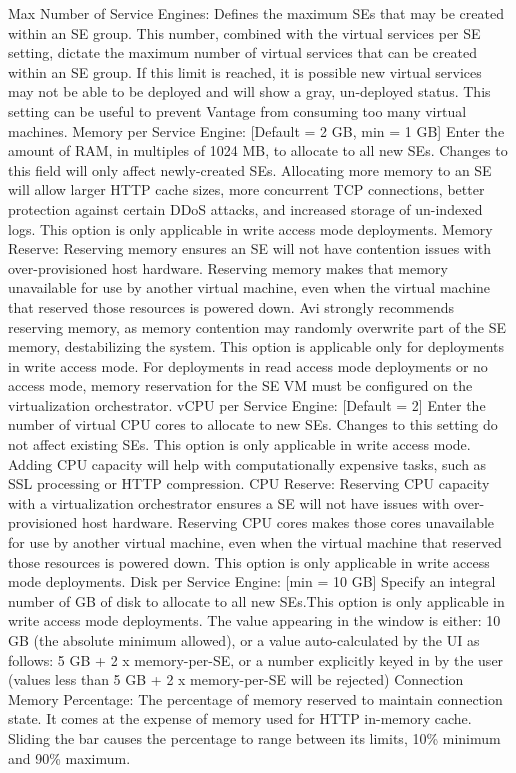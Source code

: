 \documentclass[letterpaper,10pt,english]{sphinxmanual}
\begin{document}
Max Number of Service Engines:  Defines the maximum SEs that may be created within an SE group. This number, combined with the virtual services per SE setting, dictate the maximum number of virtual services that can be created within an SE group. If this limit is reached, it is possible new virtual services may not be able to be deployed and will show a gray, un-deployed status. This setting can be useful to prevent Vantage from consuming too many virtual machines.
Memory per Service Engine:  {[}Default = 2 GB, min = 1 GB{]} Enter the amount of RAM, in multiples of 1024 MB, to allocate to all new SEs. Changes to this field will only affect newly-created SEs. Allocating more memory to an SE will allow larger HTTP cache sizes, more concurrent TCP connections, better protection against certain DDoS attacks, and increased storage of un-indexed logs. This option is only applicable in write access mode deployments.
Memory Reserve:  Reserving memory ensures an SE will not have contention issues with over-provisioned host hardware. Reserving memory makes that memory unavailable for use by another virtual machine, even when the virtual machine that reserved those resources is powered down. Avi strongly recommends reserving memory, as memory contention may randomly overwrite part of the SE memory, destabilizing the system. This option is applicable only for deployments in write access mode. For deployments in read access mode deployments or no access mode, memory reservation for the SE VM must be configured on the virtualization orchestrator.
vCPU per Service Engine:  {[}Default = 2{]} Enter the number of virtual CPU cores to allocate to new SEs. Changes to this setting do not affect existing SEs. This option is only applicable in write access mode. Adding CPU capacity will help with computationally expensive tasks, such as SSL processing or HTTP compression.
CPU Reserve:  Reserving CPU capacity with a virtualization orchestrator ensures a SE will not have issues with over-provisioned host hardware. Reserving CPU cores makes those cores unavailable for use by another virtual machine, even when the virtual machine that reserved those resources is powered down. This option is only applicable in write access mode deployments.
Disk per Service Engine: {[}min = 10 GB{]} Specify an integral number of GB of disk to allocate to all new SEs.This option is only applicable in write access mode deployments. The value appearing in the window is either:
10 GB (the absolute minimum allowed), or
a value auto-calculated by the UI as follows: 5 GB + 2 x memory-per-SE, or
a number explicitly keyed in by the user (values less than 5 GB + 2 x memory-per-SE will be rejected)
Connection Memory Percentage: The percentage of memory reserved to maintain connection state. It comes at the expense of memory used for HTTP in-memory cache. Sliding the bar causes the percentage to range between its limits, 10\% minimum and 90\% maximum.
\end{document}
